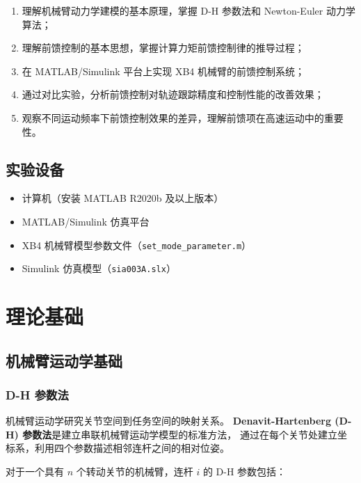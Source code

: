 \documentclass[12pt,a4paper,oneside]{article}
\numberwithin{equation}{section}
\begin{document}
\begin{enumerate}
    \item 理解机械臂动力学建模的基本原理，掌握 D-H 参数法和 Newton-Euler 动力学算法；
    \item 理解前馈控制的基本思想，掌握计算力矩前馈控制律的推导过程；
    \item 在 MATLAB/Simulink 平台上实现 XB4 机械臂的前馈控制系统；
    \item 通过对比实验，分析前馈控制对轨迹跟踪精度和控制性能的改善效果；
    \item 观察不同运动频率下前馈控制效果的差异，理解前馈项在高速运动中的重要性。
\end{enumerate}

\subsection{实验设备}

\begin{itemize}
    \item 计算机（安装 MATLAB R2020b 及以上版本）
    \item MATLAB/Simulink 仿真平台
    \item XB4 机械臂模型参数文件（\texttt{set\_mode\_parameter.m}）
    \item Simulink 仿真模型（\texttt{sia003A.slx}）
\end{itemize}

\section{理论基础}

\subsection{机械臂运动学基础}

\subsubsection{D-H 参数法}

机械臂运动学研究关节空间到任务空间的映射关系。
\textbf{Denavit-Hartenberg (D-H) 参数法}是建立串联机械臂运动学模型的标准方法，
通过在每个关节处建立坐标系，利用四个参数描述相邻连杆之间的相对位姿。

对于一个具有 $n$ 个转动关节的机械臂，连杆 $i$ 的 D-H 参数包括：
\end{document}
